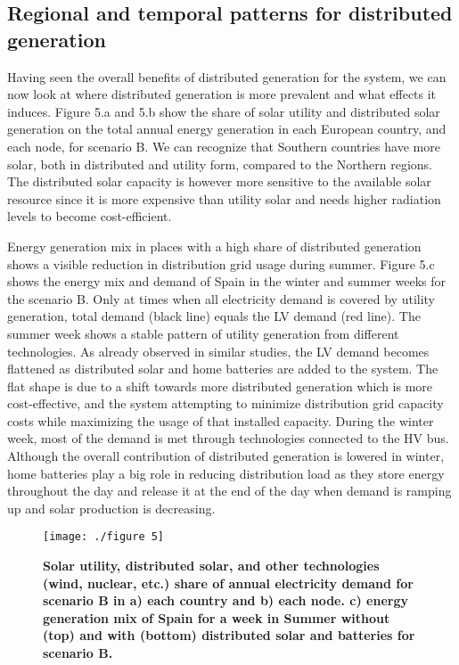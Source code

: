 \documentclass[review]{elsarticle}
\begin{document}
	
	\subsection{Regional and temporal patterns for distributed generation}
	
	Having seen the overall benefits of distributed generation for the system, we can now look at where distributed generation is more prevalent and what effects it induces. Figure 5.a and 5.b show the share of solar utility and distributed solar generation on the total annual energy generation in each European country, and each node, for scenario B. We can recognize that Southern countries have more solar, both in distributed and utility form, compared to the Northern regions. The distributed solar capacity is however more sensitive to the available solar resource since it is more expensive than utility solar and needs higher radiation levels to become cost-efficient. 
	
	Energy generation mix in places with a high share of distributed generation shows a visible reduction in distribution grid usage during summer. Figure 5.c shows the energy mix and demand of Spain in the winter and summer weeks for the scenario B. Only at times when all electricity demand is covered by utility generation, total demand (black line) equals the LV demand (red line). The summer week shows a stable pattern of utility generation from different technologies. As already observed in similar studies\cite{candas_2022,clack_2020}, the LV demand becomes flattened as distributed solar and home batteries are added to the system. The flat shape is due to a shift towards more distributed generation which is more cost-effective, and the system attempting to minimize distribution grid capacity costs while maximizing the usage of that installed capacity. During the winter week, most of the demand is met through technologies connected to the HV bus. Although the overall contribution of distributed generation is lowered in winter, home batteries play a big role in reducing distribution load as they store energy throughout the day and release it at the end of the day when demand is ramping up and solar production is decreasing.
	
	\begin{figure}
		\texttt{[image: ./figure 5]}
		\caption{\textbf{ Solar utility, distributed solar, and other technologies (wind, nuclear, etc.) share of annual electricity demand for scenario B in a) each country and b) each node. c)  energy generation mix of Spain for a week in Summer without (top) and with (bottom) distributed solar and batteries for scenario B. }}
		\label{fig:maps}
	\end{figure}
	
\end{document}

